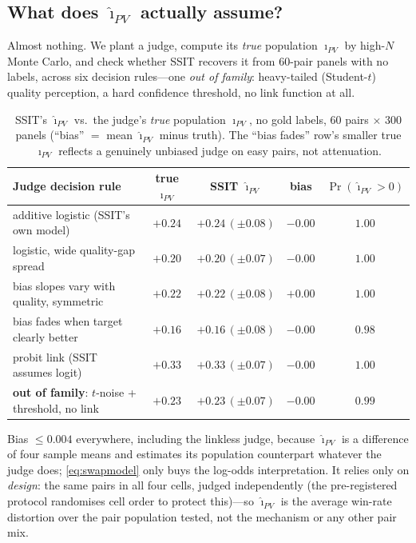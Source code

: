 \documentclass{article}
\begin{document}
\subsection{What does $\hat\imath_{PV}$ actually assume?}
\label{sec:ssit-robust}

Almost nothing. We plant a judge, compute its \emph{true} population
$\imath_{PV}$ by high-$N$ Monte Carlo, and check whether SSIT
recovers it from $60$-pair panels with no labels, across six
decision rules---one \emph{out of family}: heavy-tailed
(Student-$t$) quality perception, a hard confidence threshold, no
link function at all.

\begin{table}[htbp]
\centering
\caption{SSIT's $\hat\imath_{PV}$ vs.\ the judge's \emph{true}
population $\imath_{PV}$, no gold labels, $60$ pairs $\times$ $300$
panels (``bias'' $=$ mean $\hat\imath_{PV}$ minus truth). The ``bias
fades'' row's smaller true $\imath_{PV}$ reflects a genuinely
unbiased judge on easy pairs, not attenuation.}
\label{tab:ssit_robust}
\small
\begin{tabular}{lcccc}
\toprule
Judge decision rule & true $\imath_{PV}$ & SSIT $\hat\imath_{PV}$ & bias & $\Pr(\hat\imath_{PV}{>}0)$ \\
\midrule
additive logistic (SSIT's own model)        & $+0.24$ & $+0.24\,(\pm0.08)$ & $-0.00$ & $1.00$ \\
logistic, wide quality-gap spread           & $+0.20$ & $+0.20\,(\pm0.07)$ & $-0.00$ & $1.00$ \\
bias slopes vary with quality, symmetric    & $+0.22$ & $+0.22\,(\pm0.08)$ & $+0.00$ & $1.00$ \\
bias fades when target clearly better       & $+0.16$ & $+0.16\,(\pm0.08)$ & $-0.00$ & $0.98$ \\
probit link (SSIT assumes logit)            & $+0.33$ & $+0.33\,(\pm0.07)$ & $-0.00$ & $1.00$ \\
\textbf{out of family}: $t$-noise + threshold, no link & $+0.23$ & $+0.23\,(\pm0.07)$ & $-0.00$ & $0.99$ \\
\bottomrule
\end{tabular}
\end{table}

\noindent Bias $\leq 0.004$ everywhere, including the linkless
judge, because $\hat\imath_{PV}$ is a difference of four sample means
and estimates its population counterpart whatever the judge does;
\eqref{eq:swapmodel} only buys the log-odds interpretation. It
relies only on \emph{design}: the same pairs in all four cells,
judged independently (the pre-registered protocol randomises cell
order to protect this)---so $\hat\imath_{PV}$ is the average
win-rate distortion over the pair population tested, not the
mechanism or any other pair mix.
\end{document}
